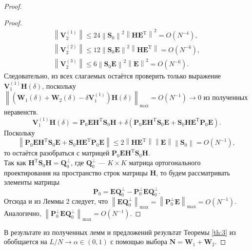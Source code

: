 \documentclass[specialist,
               substylefile = spbu_report.rtx,
               subf,href,colorlinks=true, 12pt]{disser}
\newcommand\norm[1]{\left\|#1\right\|}
\begin{document}
\begin{proof}
\begin{proof}
\begin{align*}
		\norm{\mathbf{V}_2^{(1)}}\leqslant 24\norm{\mathbf{S}_0}^2\norm{\mathbf{HE}^\mathrm{T}}^2=O(N^{-4}),\\
		\norm{\mathbf{V}_2^{(2)}}\leqslant 12\norm{\mathbf{S}_0\mathbf{E}}^2\norm{\mathbf{HE}^\mathrm{T}}=O(N^{-6}),\\
		\norm{\mathbf{V}_2^{(3)}}\leqslant 6\norm{\mathbf{S}_0\mathbf{E}}^2\norm{\mathbf{E}}^2=O(N^{-6}).
	\end{align*}
	Следовательно, из всех слагаемых остаётся проверить только выражение $\mathbf{V}_1^{(1)}\mathbf{H}(\delta)$, поскольку $\norm{(\mathbf{W}_1(\delta)+\mathbf{W}_2(\delta)-\delta\mathbf{V}_1^{(1)})\mathbf{H}(\delta)}_{\max}=O(N^{-1})\rightarrow 0$ из полученных неравенств. 
	\begin{equation*}
		\mathbf{V}_1^{(1)}\mathbf{H}(\delta) = \mathbf{P}_0\mathbf{EH}^\mathrm{T}\mathbf{S}_0\mathbf{H}+\delta(\mathbf{P}_0\mathbf{EH}^\mathrm{T}\mathbf{S}_0\mathbf{E}+\mathbf{S}_0\mathbf{HE}^\mathrm{T}\mathbf{P}_0\mathbf{E}).
	\end{equation*}
	Поскольку
	\begin{equation*}
		\norm{\mathbf{P}_0\mathbf{EH}^\mathrm{T}\mathbf{S}_0\mathbf{E}+\mathbf{S}_0\mathbf{HE}^\mathrm{T}\mathbf{P}_0\mathbf{E}}\leqslant 2\norm{\mathbf{HE}^\mathrm{T}}\norm{\mathbf{E}}\norm{\mathbf{S}_0}=O(N^{-1}),
	\end{equation*}
	то остаётся разобраться с матрицей $\mathbf{P}_0\mathbf{EH}^\mathrm{T}\mathbf{S}_0\mathbf{H}$.\\
	Так как $\mathbf{H}^\mathrm{T}\mathbf{S}_0\mathbf{H}=\mathbf{Q}_0^\bot$, где $\mathbf{Q}_0^\bot$ --- $K\times K$ матрица ортогонального проектирования на пространство строк матрицы $\mathbf{H}$, то будем рассматривать элементы матрицы
	\begin{equation*}
		\mathbf{P}_0 = \mathbf{E}\mathbf{Q}_0^\bot - \mathbf{P}_0^\bot\mathbf{E}\mathbf{Q}_0^\bot.
	\end{equation*}
	 Отсюда и из Леммы 2 \cite{ZNekrutkin} следует, что $\norm{\mathbf{E}\mathbf{Q}_0^\bot}_{\max}=\norm{\mathbf{P}_0^\bot\mathbf{E}}_{\max}=O(N^{-1})$. Аналогично, $\norm{\mathbf{P}_0^\bot\mathbf{E}\mathbf{Q}_0^\bot}_{\max}=O(N^{-1})$.
\end{proof}
В результате из полученных лемм и предложений результат Теоремы \ref{th:3} из \cite{ZNekrutkin} обобщается на $L/N\rightarrow \alpha\in(0, 1)$ с помощью выбора $\mathbf{N} = \mathbf{W}_1 + \mathbf{W}_2$.
\end{proof} 
\end{document}

